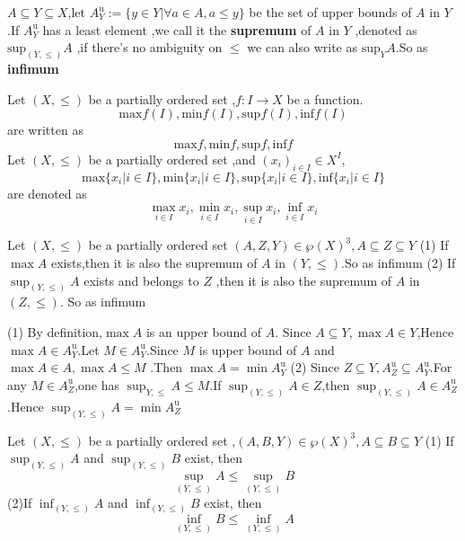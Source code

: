 \documentclass{book}
\numberwithin{equation}{section}
\begin{document}
\begin{definitionenv}
    $A\subseteq Y\subseteq X$,let $A_Y^\mathrm{u}:=\{y\in Y|\forall a\in A,a\le y\}$ be the set of upper bounds of $A$ in $Y$.If $A_Y^\mathrm{u}$ has a least element ,we call it the \textbf{supremum} of $A$ in $Y$ ,denoted as $\mathrm{sup}_{(Y,\le)}A$ ,if there's no ambiguity on $\le$ we can also write as $\mathrm{sup}_{Y}A$.So as \textbf{infimum}
\end{definitionenv}
\begin{notationenv}\label{notation4.5.1}
    
         Let $(X,\le)$ be a partially ordered set ,$f:I\rightarrow X$ be a function.$$\mathrm{max}f(I),\mathrm{min}f(I),\mathrm{sup}f(I),\mathrm{inf}f(I)$$ are written as $$\mathrm{max}f,\mathrm{min}f,\mathrm{sup}f,\mathrm{inf}f$$
         Let $(X,\le)$ be a partially ordered set ,and $(x_i)_{i\in I}\in X^I$,$$\mathrm{max}\{x_i|i\in I\},\mathrm{min}\{x_i|i\in I\},\mathrm{sup}\{x_i|i\in I\},\mathrm{inf}\{x_i|i\in I\}$$ are denoted as $$\max _{i\in I}x_i,\min _{i\in I}x_i,\sup _{i\in I}x_i,\inf _{i\in I}x_i$$
    
\end{notationenv}
\begin{propositionenv}\label{proposition4.5.1}
    Let $(X,\le)$ be a partially ordered set $(A,Z,Y)\in \wp (X)^3,A\subseteq Z\subseteq Y$
    \newline
   (1) If $\max A$ exists,then it is also the supremum of $A$ in $(Y,\le)$.So as infimum
    \newline
    (2) If $\sup_{(Y,\le)}A$ exists and belongs to $Z$ ,then it is also the supremum of $A$ in $(Z,\le)$. So as infimum
\end{propositionenv}
\begin{proofenv}
    \quad \newline
   (1) By definition,$\max A $ is an upper bound of $A$. Since $A\subseteq Y, \max A \in Y$,Hence $\max A\in A_Y^\mathrm{u}$.Let $M\in A_Y^\mathrm{u} $.Since $M$ is upper bound of $A$ and $\max A\in A,\max A\le M$ .Then $\max A=\min A_Y^\mathrm{u}$
\newline
(2) Since $Z\subseteq Y,A_Z^\mathrm{u}\subseteq A_Y^\mathrm{u}$.For any $M\in A_Z^\mathrm{u}$,one has $\sup _{Y,\le}A\le M$.If $\sup_{(Y,\le)}A\in Z$,then $\sup_{(Y,\le)}A\in A_Z^\mathrm{u}$.Hence $\sup _{(Y,\le)}A=\min A_Z^\mathrm{u}$
\end{proofenv}
\begin{propositionenv}\label{proposition4.5.2}
    Let $(X,\le )$ be a partially ordered set ,$(A,B,Y)\in \wp (X)^3,A\subseteq B\subseteq Y$
    \newline
    (1) If $\sup_{(Y,\le)}A$ and $\sup_{(Y,\le)}B$ exist, then $$\sup_{(Y,\le)}A \le \sup_{(Y,\le)}B$$
    \newline
    (2)If $\inf_{(Y,\le)}A$ and $\inf_{(Y,\le)}B$ exist, then $$\inf_{(Y,\le)}B \le \inf_{(Y,\le)}A$$
    
\end{propositionenv}
\end{document}
